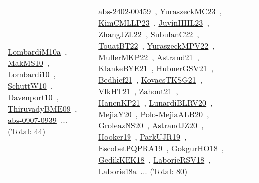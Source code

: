 {\begin{longtable}{lp{3cm}>{\raggedright\arraybackslash}p{6cm}>{\raggedright\arraybackslash}p{6cm}>{\raggedright\arraybackslash}p{8cm}}
\href{works/LombardiM10a.pdf}{LombardiM10a}~\cite{LombardiM10a}, \href{works/MakMS10.pdf}{MakMS10}~\cite{MakMS10}, \href{works/Lombardi10.pdf}{Lombardi10}~\cite{Lombardi10}, \href{works/SchuttW10.pdf}{SchuttW10}~\cite{SchuttW10}, \href{works/Davenport10.pdf}{Davenport10}~\cite{Davenport10}, \href{works/ThiruvadyBME09.pdf}{ThiruvadyBME09}~\cite{ThiruvadyBME09}, \href{works/abs-0907-0939.pdf}{abs-0907-0939}~\cite{abs-0907-0939}... (Total: 44) & \href{works/abs-2402-00459.pdf}{abs-2402-00459}~\cite{abs-2402-00459}, \href{works/YuraszeckMC23.pdf}{YuraszeckMC23}~\cite{YuraszeckMC23}, \href{works/KimCMLLP23.pdf}{KimCMLLP23}~\cite{KimCMLLP23}, \href{works/JuvinHHL23.pdf}{JuvinHHL23}~\cite{JuvinHHL23}, \href{works/ZhangJZL22.pdf}{ZhangJZL22}~\cite{ZhangJZL22}, \href{works/SubulanC22.pdf}{SubulanC22}~\cite{SubulanC22}, \href{works/TouatBT22.pdf}{TouatBT22}~\cite{TouatBT22}, \href{works/YuraszeckMPV22.pdf}{YuraszeckMPV22}~\cite{YuraszeckMPV22}, \href{works/MullerMKP22.pdf}{MullerMKP22}~\cite{MullerMKP22}, \href{works/Astrand21.pdf}{Astrand21}~\cite{Astrand21}, \href{works/KlankeBYE21.pdf}{KlankeBYE21}~\cite{KlankeBYE21}, \href{works/HubnerGSV21.pdf}{HubnerGSV21}~\cite{HubnerGSV21}, \href{works/Bedhief21.pdf}{Bedhief21}~\cite{Bedhief21}, \href{works/KovacsTKSG21.pdf}{KovacsTKSG21}~\cite{KovacsTKSG21}, \href{works/VlkHT21.pdf}{VlkHT21}~\cite{VlkHT21}, \href{works/Zahout21.pdf}{Zahout21}~\cite{Zahout21}, \href{works/HanenKP21.pdf}{HanenKP21}~\cite{HanenKP21}, \href{works/LunardiBLRV20.pdf}{LunardiBLRV20}~\cite{LunardiBLRV20}, \href{works/MejiaY20.pdf}{MejiaY20}~\cite{MejiaY20}, \href{works/Polo-MejiaALB20.pdf}{Polo-MejiaALB20}~\cite{Polo-MejiaALB20}, \href{works/GroleazNS20.pdf}{GroleazNS20}~\cite{GroleazNS20}, \href{works/AstrandJZ20.pdf}{AstrandJZ20}~\cite{AstrandJZ20}, \href{works/Hooker19.pdf}{Hooker19}~\cite{Hooker19}, \href{works/ParkUJR19.pdf}{ParkUJR19}~\cite{ParkUJR19}, \href{works/EscobetPQPRA19.pdf}{EscobetPQPRA19}~\cite{EscobetPQPRA19}, \href{works/GokgurHO18.pdf}{GokgurHO18}~\cite{GokgurHO18}, \href{works/GedikKEK18.pdf}{GedikKEK18}~\cite{GedikKEK18}, \href{works/LaborieRSV18.pdf}{LaborieRSV18}~\cite{LaborieRSV18}, \href{works/Laborie18a.pdf}{Laborie18a}~\cite{Laborie18a}... (Total: 80)\\

\end{longtable}}
